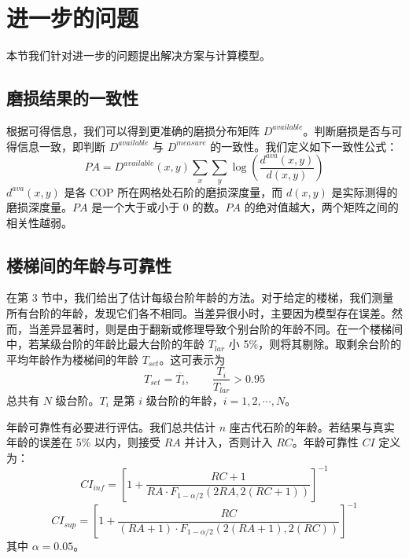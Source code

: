 \documentclass[11pt,a4paper]{ctexart}
\begin{document}
\section{进一步的问题}

本节我们针对进一步的问题提出解决方案与计算模型。

\subsection{磨损结果的一致性}

根据可得信息，我们可以得到更准确的磨损分布矩阵 \(D^{available}\)。判断磨损是否与可得信息一致，即判断 \(D^{available}\) 与 \(D^{measure}\) 的一致性。我们定义如下一致性公式：
\begin{equation}
PA=D^{available}(x,y)\sum_x\sum_y\log\left(\frac{d^{ava}(x,y)}{d(x,y)}\right) \tag{4.1}
\end{equation}
\(d^{ava}(x,y)\) 是各 COP 所在网格处石阶的磨损深度量，而 \(d(x,y)\) 是实际测得的磨损深度量。\(PA\) 是一个大于或小于 0 的数。\(PA\) 的绝对值越大，两个矩阵之间的相关性越弱。

\subsection{楼梯间的年龄与可靠性}

在第 3 节中，我们给出了估计每级台阶年龄的方法。对于给定的楼梯，我们测量所有台阶的年龄，发现它们各不相同。当差异很小时，主要因为模型存在误差。然而，当差异显著时，则是由于翻新或修理导致个别台阶的年龄不同。在一个楼梯间中，若某级台阶的年龄比最大台阶的年龄 \(T_{lar}\) 小 5\%，则将其剔除。取剩余台阶的平均年龄作为楼梯间的年龄 \(T_{set}\)。这可表示为
\begin{equation}
T_{set}=\overline{T_i},\qquad \frac{T_i}{T_{lar}}>0.95 \tag{4.2}
\end{equation}
总共有 \(N\) 级台阶。\(T_i\) 是第 \(i\) 级台阶的年龄，\(i=1,2,\cdots,N\)。

年龄可靠性有必要进行评估。我们总共估计 \(n\) 座古代石阶的年龄。若结果与真实年龄的误差在 5\% 以内，则接受 \(RA\) 并计入，否则计入 \(RC\)。年龄可靠性 \(CI\) 定义为：
\begin{equation}
CI_{inf}=\left[1+\frac{RC+1}{RA\cdot F_{1-\alpha/2}(2RA,2(RC+1))}\right]^{-1} \tag{4.3}
\end{equation}
\begin{equation}
CI_{sup}=\left[1+\frac{RC}{(RA+1)\cdot F_{1-\alpha/2}(2(RA+1),2(RC))}\right]^{-1} \tag{4.4}
\end{equation}
其中 \(\alpha=0.05\)。
\end{document}
